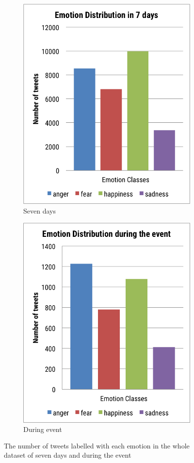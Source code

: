 \begin{figure}[htb!] 
\centering 
\begin{subfigure}{0.5\textwidth}
\centering
\includegraphics[width=0.75\linewidth]{EmotionDistributionWeek}
\caption{Seven days}
\label{fig:emotionDistributionWeek}
\end{subfigure}%
\begin{subfigure}{0.5\textwidth}
\centering
\includegraphics[width=0.75\linewidth]{EmotionDistributionEvent}
\caption{During event}
\label{fig:emotionDistributionEvent}
\end{subfigure}
\caption{The number of tweets labelled with each emotion in the whole dataset of seven days and during the event}
\end{figure}

